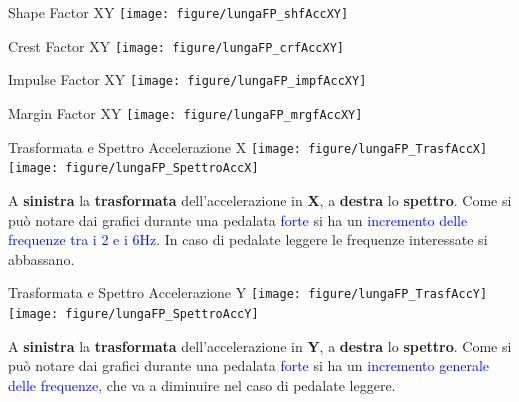 \documentclass[a4paper, 9pt]{beamer}
\begin{document}
	\begin{frame}{{Shape Factor XY}}
		\vspace{.05\textheight}
		\centering\texttt{[image: figure/lungaFP\_shfAccXY]}	
	
	\end{frame}
	
	\begin{frame}{{Crest Factor XY}}
		\vspace{.05\textheight}
		\centering\texttt{[image: figure/lungaFP\_crfAccXY]}	
		
	\end{frame}
	
	\begin{frame}{{Impulse Factor XY}}
		\vspace{.05\textheight}
		\centering\texttt{[image: figure/lungaFP\_impfAccXY]}	
		
	\end{frame}
	
	\begin{frame}{{Margin Factor XY}}
		\vspace{.05\textheight}
		\centering\texttt{[image: figure/lungaFP\_mrgfAccXY]}	
		
	\end{frame}
	
	\begin{frame}{{Trasformata e Spettro Accelerazione X}}
		\centering\texttt{[image: figure/lungaFP\_TrasfAccX]}
		\hspace{.05\textwidth}
		\centering\texttt{[image: figure/lungaFP\_SpettroAccX]}
		\vspace{.05\textheight}
		
		A \textbf{sinistra} la \textbf{trasformata} dell'accelerazione in \textbf{X}, a \textbf{destra} lo \textbf{spettro}.
		Come si può notare dai grafici durante una pedalata \textcolor{blue}{forte} si ha un \textcolor{blue}{incremento delle frequenze tra i 2 e i 6Hz}. In caso di pedalate leggere le frequenze interessate si abbassano.
	\end{frame}
	
	\begin{frame}{{Trasformata e Spettro Accelerazione Y}}
		\centering\texttt{[image: figure/lungaFP\_TrasfAccY]}
		\hspace{.05\textwidth}
		\centering\texttt{[image: figure/lungaFP\_SpettroAccY]}
		\vspace{.05\textheight}
		
		A \textbf{sinistra} la \textbf{trasformata} dell'accelerazione in \textbf{Y}, a \textbf{destra} lo \textbf{spettro}.
		Come si può notare dai grafici durante una pedalata \textcolor{blue}{forte} si ha un \textcolor{blue}{incremento generale delle frequenze}, che va a diminuire nel caso di pedalate leggere.
	\end{frame}
	
\end{document}
